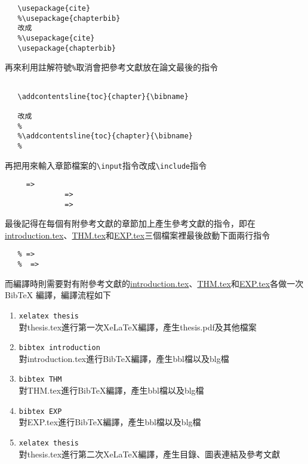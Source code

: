 \begin{acknowledgementsCH}
\begin{enumerate}[leftmargin=0pt, topsep=0pt, itemsep=0pt, label=\Roman{*}.]
       \begin{verbatim}
   \usepackage{cite}
   %\usepackage{chapterbib}
   改成
   %\usepackage{cite}
   \usepackage{chapterbib}
       \end{verbatim}
       再來利用註解符號\texttt{\%}取消會把參考文獻放在論文最後的指令
       \begin{verbatim}
   
   \addcontentsline{toc}{chapter}{\bibname}
   
   改成
   %
   %\addcontentsline{toc}{chapter}{\bibname}
   %
       \end{verbatim}
       再把用來輸入章節檔案的\texttt{\textbackslash input}指令改成\texttt{\textbackslash include}指令
        \begin{verbatim}
     =>  
              =>  
              =>  
        \end{verbatim}
       最後記得在每個有附參考文獻的章節加上產生參考文獻的指令，即在\href{run:./introduction.tex}{introduction.tex}、\href{run:./THM.tex}{THM.tex}和\href{run:./EXP.tex}{EXP.tex}三個檔案裡最後啟動下面兩行指令
        \begin{verbatim}
   % => 
   %  =>  
        \end{verbatim}
       而編譯時則需要對有附參考文獻的\href{run:./introduction.tex}{introduction.tex}、\href{run:./THM.tex}{THM.tex}和\href{run:./EXP.tex}{EXP.tex}各做一次BibTeX 編譯，編譯流程如下
       \begin{enumerate}[topsep=0pt, itemsep=0pt, label=\arabic{*}.]
       \item \texttt{xelatex thesis}\\ 對thesis.tex進行第一次XeLaTeX編譯，產生thesis.pdf及其他檔案
       \item \texttt{bibtex introduction}\\ 對introduction.tex進行BibTeX編譯，產生bbl檔以及blg檔
       \item \texttt{bibtex THM}\\ 對THM.tex進行BibTeX編譯，產生bbl檔以及blg檔
       \item \texttt{bibtex EXP}\\ 對EXP.tex進行BibTeX編譯，產生bbl檔以及blg檔
       \item \texttt{xelatex thesis}\\ 對thesis.tex進行第二次XeLaTeX編譯，產生目錄、圖表連結及參考文獻

\end{enumerate}
\end{enumerate}
\end{acknowledgementsCH}
